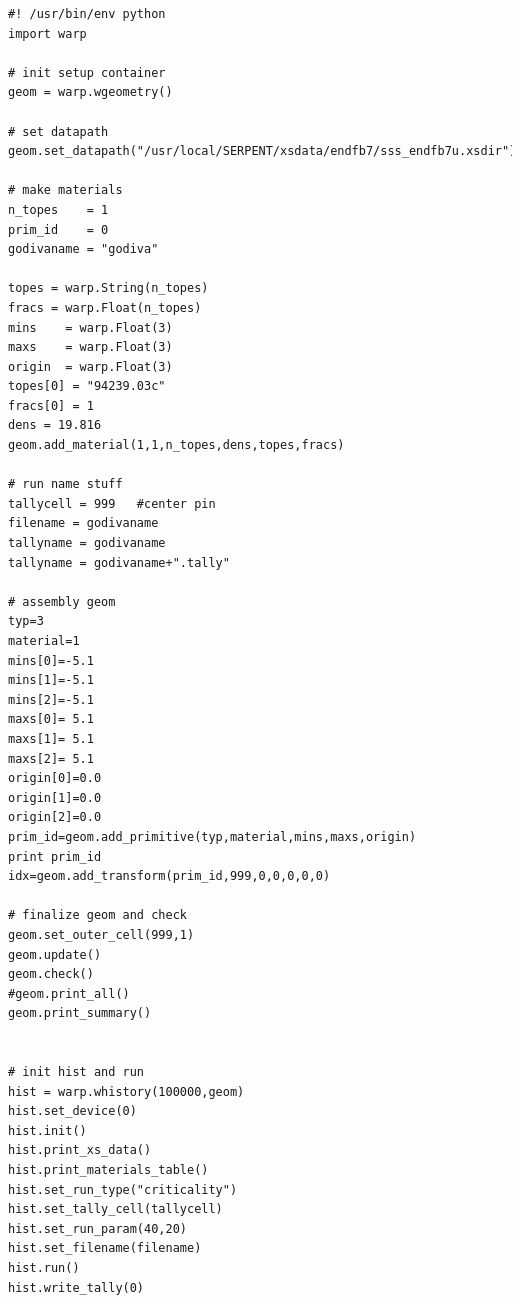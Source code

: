 \documentclass[twoside,a4paper]{refart}
\begin{document}
\begin{verbatim}
#! /usr/bin/env python
import warp

# init setup container
geom = warp.wgeometry()

# set datapath
geom.set_datapath("/usr/local/SERPENT/xsdata/endfb7/sss_endfb7u.xsdir")

# make materials
n_topes    = 1
prim_id    = 0
godivaname = "godiva"

topes = warp.String(n_topes)
fracs = warp.Float(n_topes)
mins    = warp.Float(3)
maxs    = warp.Float(3)
origin  = warp.Float(3)
topes[0] = "94239.03c"
fracs[0] = 1
dens = 19.816
geom.add_material(1,1,n_topes,dens,topes,fracs)

# run name stuff
tallycell = 999   #center pin
filename = godivaname
tallyname = godivaname
tallyname = godivaname+".tally"

# assembly geom
typ=3
material=1
mins[0]=-5.1
mins[1]=-5.1
mins[2]=-5.1
maxs[0]= 5.1
maxs[1]= 5.1
maxs[2]= 5.1
origin[0]=0.0
origin[1]=0.0
origin[2]=0.0
prim_id=geom.add_primitive(typ,material,mins,maxs,origin)
print prim_id
idx=geom.add_transform(prim_id,999,0,0,0,0,0)

# finalize geom and check
geom.set_outer_cell(999,1)
geom.update()
geom.check()
#geom.print_all()
geom.print_summary()


# init hist and run
hist = warp.whistory(100000,geom)
hist.set_device(0)
hist.init()
hist.print_xs_data()
hist.print_materials_table()
hist.set_run_type("criticality")
hist.set_tally_cell(tallycell)
hist.set_run_param(40,20)
hist.set_filename(filename)
hist.run()
hist.write_tally(0)
\end{verbatim}



\printindex
\end{document}
